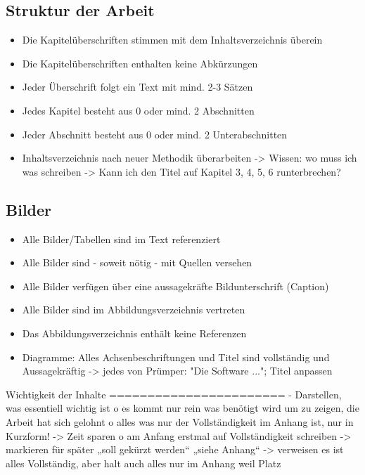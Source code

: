 \subsection*{Struktur der Arbeit}\label{sec:checklists:structure}
%
\begin{itemize}
  \vspace{-3mm}
  \item[\Square] Die Kapitelüberschriften stimmen mit dem Inhaltsverzeichnis überein
  \item[\Square] Die Kapitelüberschriften enthalten keine Abkürzungen
  \item[\Square] Jeder Überschrift folgt ein Text mit mind. 2-3 Sätzen
  \item[\Square] Jedes Kapitel besteht aus 0 oder mind. 2 Abschnitten
  \item[\Square] Jeder Abschnitt besteht aus 0 oder mind. 2 Unterabschnitten
  \item Inhaltsverzeichnis nach neuer Methodik überarbeiten
  ->	Wissen: wo muss ich was schreiben
  ->	Kann ich den Titel auf Kapitel 3, 4, 5, 6 runterbrechen?
\end{itemize}

\subsection*{Bilder}\label{sec:checklists:pictures}
%
\begin{itemize}
  \vspace{-3mm}
  \item[\Square] Alle Bilder/Tabellen sind im Text referenziert
  \item[\Square] Alle Bilder sind - soweit nötig - mit Quellen versehen
  \item[\Square] Alle Bilder verfügen über eine aussagekräfte Bildunterschrift (Caption)
  \item[\Square] Alle Bilder sind im Abbildungsverzeichnis vertreten
  \item[\Square] Das Abbildungsverzeichnis enthält keine Referenzen
  \item[\Square] Diagramme: Alles Achsenbeschriftungen und Titel sind vollständig und Aussagekräftig
  -> jedes von Prümper: "Die Software ..."; Titel anpassen
\end{itemize}

Wichtigkeit der Inhalte
=======================
-	Darstellen, was essentiell wichtig ist
o	es kommt nur rein was benötigt wird um zu zeigen, die Arbeit hat sich gelohnt
o	alles was nur der Vollständigkeit im Anhang ist, nur in Kurzform!
    -> Zeit sparen
o	am Anfang erstmal auf Vollständigkeit schreiben
    -> markieren für später „soll gekürzt werden“ „siehe Anhang“
    -> verweisen es ist alles Vollständig, aber halt auch alles nur im Anhang weil Platz

